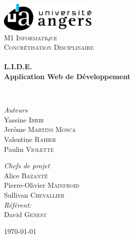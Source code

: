 \begin{titlepage}
\begin{center}

\includegraphics[width=0.35\textwidth]{./logo}~\\[1cm]

\textsc{\LARGE M1 Informatique}\\[1.5cm]

\textsc{\Large Concrétisation Disciplinaire}\\[0.5cm]

\HRule \\[0.4cm]

{\huge \bfseries L.I.D.E.\\
Application Web de Développement \\[0.4cm] }

\HRule \\[1.5cm]

\begin{minipage}{0.4\textwidth}
\begin{flushleft} \large
\emph{Auteurs}\\
Yassine \textsc{Ibrir}\\
Jerôme \textsc{Martins Mosca}\\
Valentine \textsc{Rahier}\\
Paulin \textsc{Violette}\\
\end{flushleft}
\end{minipage}
\begin{minipage}{0.4\textwidth}
\begin{flushright} \large
\emph{Chefs de projet}\\
Alice \textsc{Bazanté}\\
Pierre-Olivier \textsc{Mainfroid}\\
Sullivan \textsc{Chevallier}\\
\emph{Référent:} \\
David \textsc{Genest}
\end{flushright}
\end{minipage}

\vfill

{\large \today}

\end{center}
\end{titlepage}